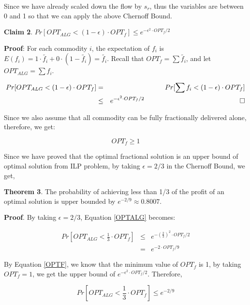 \documentclass[onecolumn,11pt,journal, compsoc]{IEEEtran}
\newcommand*{\QEDB}{\hfill\ensuremath{\square}}%
\begin{document}
Since we have already scaled down the flow by $s_r$, thus the variables are between 0 and 1 so that we can apply the above Chernoff Bound.

\vspace*{0.15in}
\textbf{Claim 2}. $Pr[OPT_{ALG} < (1-\epsilon) \cdot OPT_f] \le e^{-\epsilon^2 \cdot OPT_f / 2}$ 
\vspace*{0.15in}

\textbf{Proof}: For each commodity $i$, the expectation of $f_i$ is $E(f_i) = 1 \cdot \tilde{f_i} + 0 \cdot (1-\tilde{f_i}) = \tilde{f_i}$. Recall that $OPT_f = \sum{\tilde{f_i}} $, and let $OPT_{ALG} = \sum{f_i}$.

\begin{eqnarray} \label{OPTALG}
Pr[OPT_{ALG}  < (1-\epsilon) \cdot OPT_f] &=& Pr[\sum{f_i} < (1-\epsilon) \cdot OPT_f] \\ \nonumber
&\le& e^{-\epsilon^2 \cdot OPT_f / 2}  \,\,\,\,\,\,\,\,\,\,\,\,\,\,\,\,\,\,\,\,\,\,\,\,\,\,\,\,\,\,\,\,\,\,\,\,\,\,\,\,\,\,\,\,\,\,\,\,\,\,\,\,\,\,\,\,\,\,\,\,\,\,\,\,\,\,\,\,\,\,\,\,\,\,\,\,\,\,\,\,\,\,\,\,\,\QEDB \nonumber
\end{eqnarray}

 Since we also assume that all commodity can be fully fractionally delivered alone, therefore, we get:

\begin{equation} \label{OPTF}
	OPT_{f} \ge 1
\end{equation}

Since we have proved that the optimal fractional solution is an upper bound of optimal solution from ILP problem, by taking $\epsilon = 2/3$ in the Chernoff Bound, we get, 

\textbf{Theorem 3}. The probability of achieving less than 1/3 of the profit of an optimal solution is upper bounded by $e^{-2/9} \approx 0.8007$.

\textbf{Proof}.
By taking $\epsilon = 2/3$, Equation \ref{OPTALG} becomes:

\begin{eqnarray}
	Pr[OPT_{ALG}  < \frac{1}{3} \cdot OPT_f] &\le& e^{-(\frac{2}{3})^2 \cdot OPT_f / 2} \\
	&=& e^{-2 \cdot OPT_f/9}
\end{eqnarray}

By Equation \ref{OPTF}, we know that the minimum value of $OPT_f$ is 1, by taking $OPT_f = 1$, we get the upper bound of $e^{-\epsilon^2 \cdot OPT_f / 2}$. Therefore,

\begin{equation}
Pr[OPT_{ALG}  < \frac{1}{3} \cdot OPT_f] \le e^{-2/9}
\end{equation}
\end{document}
